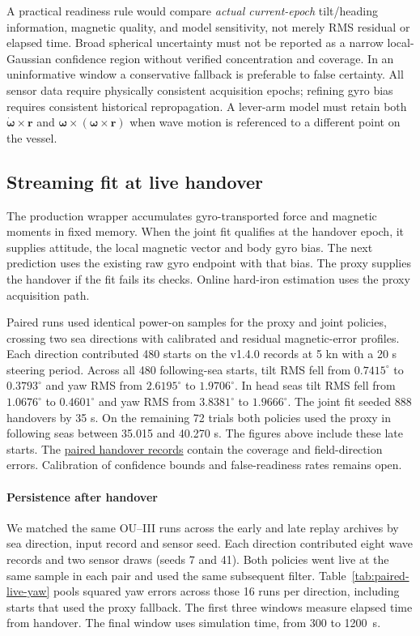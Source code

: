 \documentclass[conference]{IEEEtran}
\DeclareRobustCommand{\vct}[1]{\bm{#1}}
\begin{document}
A practical readiness rule would compare \emph{actual current-epoch}
tilt/heading information, magnetic quality, and model sensitivity,
not merely RMS residual or elapsed time.  Broad spherical
uncertainty must not be reported as a narrow local-Gaussian
confidence region without verified concentration and coverage.  In an uninformative
window a conservative fallback is preferable to false certainty.
All sensor data require physically consistent acquisition epochs;
refining gyro bias requires consistent historical repropagation.
A lever-arm model must retain both
$\dot{\vct\omega}\times\vct r$ and
$\vct\omega\times(\vct\omega\times\vct r)$ when wave motion is
referenced to a different point on the vessel.

\subsection{Streaming fit at live handover}
\label{sec:streaming-handover}
The production wrapper accumulates gyro-transported force and magnetic
moments in fixed memory. When the joint fit qualifies at the handover
epoch, it supplies attitude, the local magnetic vector and body gyro bias.
The next prediction uses the existing raw gyro endpoint with that bias.
The proxy supplies the handover if the fit fails its checks. Online
hard-iron estimation uses the proxy acquisition path.

Paired runs used identical power-on samples for the proxy and joint
policies, crossing two sea directions with calibrated and residual
magnetic-error profiles. Each direction contributed 480 starts on the
v1.4.0 records at 5 kn with a 20 s steering period. Across all 480
following-sea starts, tilt RMS fell from $0.7415^\circ$ to $0.3793^\circ$
and yaw RMS from $2.6195^\circ$ to $1.9706^\circ$. In head seas tilt RMS
fell from $1.0676^\circ$ to $0.4601^\circ$ and yaw RMS from $3.8381^\circ$
to $1.9666^\circ$. The joint fit seeded 888 handovers by 35 s. On the
remaining 72 trials both policies used the proxy in following seas between
35.015 and 40.270 s. The figures above include these late starts.
The \href{https://github.com/bareboat-necessities/ocean-imu/tree/1ad97346644532cb44c5f32f29aaa3ec148140ff/reports/results/startup_learning/field_steps}{paired handover records}
contain the coverage and field-direction errors. Calibration of confidence
bounds and false-readiness rates remains open.

\paragraph{Persistence after handover}
We matched the same OU--III runs across the early and late replay archives
by sea direction, input record and sensor seed. Each direction contributed
eight wave records and two sensor draws (seeds 7 and 41). Both policies went
live at the same sample in each pair and used the same subsequent filter.
Table~\ref{tab:paired-live-yaw} pools squared yaw errors across those
16 runs per direction, including starts that used the proxy fallback.
The first three windows measure elapsed time from handover.
The final window uses simulation time, from 300 to 1200~s.
\end{document}
